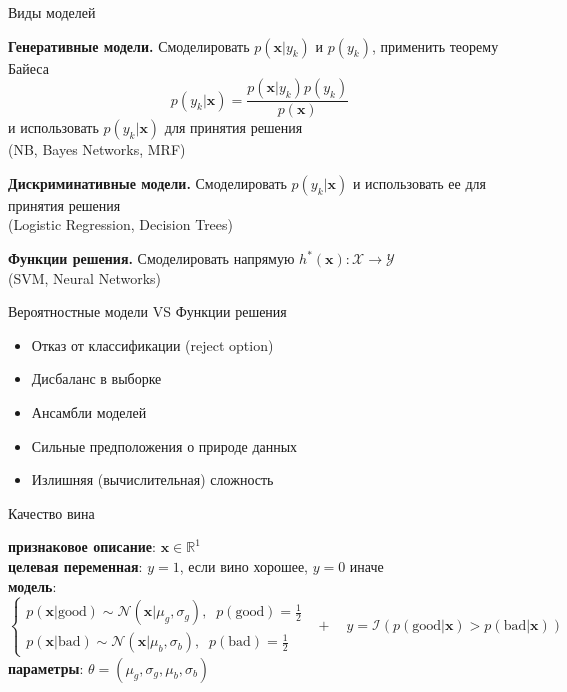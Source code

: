 \documentclass[aspectratio=169]{beamer}
\begin{document}
\begin{frame}{Виды моделей}

{\bf Генеративные модели.} Смоделировать $p(\mathbf{x} | y_k)$ и $p(y_k)$, применить теорему Байеса
\[
p(y_k | \mathbf{x}) = \frac{p(\mathbf{x} | y_k) p(y_k)}{p(\mathbf{x})}
\]
и использовать $p(y_k | \mathbf{x})$ для принятия решения \\ (NB, Bayes Networks, MRF)
\vspace{1em}

{\bf Дискриминативные модели.} Смоделировать $p(y_k | \mathbf{x})$ и использовать ее для принятия решения \\ (Logistic Regression, Decision Trees)
\vspace{1em}

{\bf Функции решения.} Смоделировать напрямую $h^*(\mathbf{x}): \mathcal{X} \rightarrow \mathcal{Y}$ \\ (SVM, Neural Networks)

\end{frame}

\begin{frame}{Вероятностные модели VS Функции решения}

\begin{itemize}
\item[\color{green}\ding{108}] Отказ от классификации (reject option)
\item[\color{green}\ding{108}] Дисбаланс в выборке
\item[\color{green}\ding{108}] Ансамбли моделей
\item[\color{red}\ding{108}] Сильные предположения о природе данных
\item[\color{red}\ding{108}] Излишняя (вычислительная) сложность
\end{itemize}

\end{frame}

\begin{frame}{Качество вина}
    
{\bf признаковое описание}: $\mathbf{x} \in \mathbb{R}^1$ \\
\vspace{1em}
{\bf целевая переменная}: $y = 1$, если вино хорошее, $y = 0$ иначе \\
\vspace{1em}
{\bf модель}:
\[
\begin{cases}
p(\mathbf{x} | \text{good}) \sim \mathcal{N}(\mathbf{x} | \mu_g, \sigma_g), \;\; p(\text{good}) = \frac 1 2 \\
p(\mathbf{x} |  \text{bad}) \sim \mathcal{N}(\mathbf{x} | \mu_b, \sigma_b), \;\; p( \text{bad}) = \frac 1 2
\end{cases} \;\; + \quad y = \mathcal{I}(p(\text{good} | \mathbf{x}) > p(\text{bad} | \mathbf{x}))
\]
\vspace{1em}
{\bf параметры}: $\theta = (\mu_g, \sigma_g, \mu_b, \sigma_b)$

\end{frame}
\end{document}
